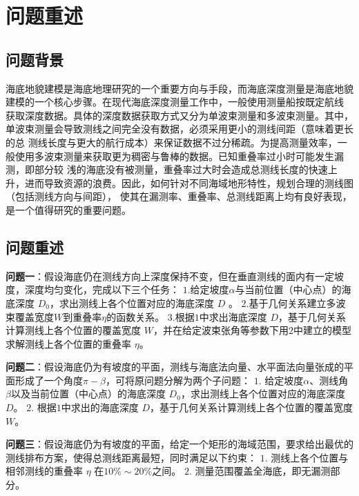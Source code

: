 \documentclass[withoutpreface,bwprint]{cumcmthesis} %
\begin{document}
\begin{abstract}
        \end{abstract}
        \section{问题重述}
        \subsection{问题背景}
        海底地貌建模是海底地理研究的一个重要方向与手段，而海底深度测量是海底地貌建模的一个核心步骤。在现代海底深度测量工作中，一般使用测量船按既定航线
        获取深度数据。具体的深度数据获取方式又分为单波束测量和多波束测量。其中，单波束测量会导致测线之间完全没有数据，必须采用更小的测线间距（意味着更长的总
        测线长度与更大的航行成本）来保证数据不过分稀疏。为提高测量效率，一般使用多波束测量来获取更为稠密与鲁棒的数据。已知重叠率过小时可能发生漏测，即部分较
        浅的海底没有被测量，重叠率过大时会造成总测线长度的快速上升，进而导致资源的浪费。因此，如何针对不同海域地形特性，规划合理的测线图（包括测线方向与间距），
        使其在漏测率、重叠率、总测线距离上均有良好表现，是一个值得研究的重要问题。

        \subsection{问题重述}

        \textbf{问题一}：假设海底仍在测线方向上深度保持不变，但在垂直测线的面内有一定坡度，深度均匀变化，完成以下三个任务：
            $1$.给定坡度$\alpha$与当前位置（中心点）的海底深度 $D_0$，求出测线上各个位置对应的海底深度 $D$ 。
            $2$.基于几何关系建立多波束覆盖宽度$W$到重叠率$\eta$的函数关系。
            $3$.根据$1$中求出海底深度 $D$，基于几何关系计算测线上各个位置的覆盖宽度 $W$，并在给定波束张角等参数下用$2$中建立的模型求解测线上各个位置的重叠率 $\eta$。

        \textbf{问题二}：假设海底仍为有坡度的平面，测线与海底法向量、水平面法向量张成的平面形成了一个角度$\pi - \beta$，可将原问题分解为两个子问题：
            $1$. 给定坡度$\alpha$、测线角$\beta$以及当前位置（中心点）的海底深度 $D_0$，求出测线上各个位置对应的海底深度 $D$。
            $2$. 根据$1$中求出的海底深度 $D$，基于几何关系计算测线上各个位置的覆盖宽度 $W$。
        
        \textbf{问题三}：假设海底仍为有坡度的平面，给定一个矩形的海域范围，要求给出最优的测线排布方案，使得总测线距离最短，同时满足以下约束：
               $1$. 测线上各个位置与相邻测线的重叠率 $\eta$ 在$10\%\sim 20\%$之间。
               $2$. 测量范围覆盖全海底，即无漏测部分。
\end{document}
